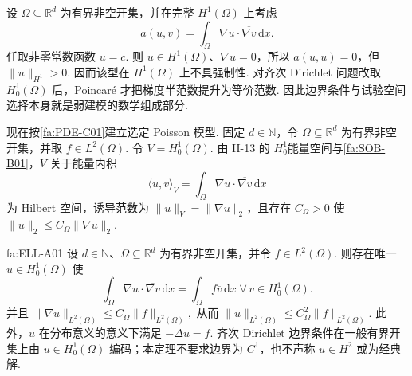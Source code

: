 \begin{FACounterexample}[试验空间选择会决定强制性]\label{ii15:h1-gradient-noncoercive}
设 \(\displaystyle\Omega\subseteq\mathbb R^d\) 为有界非空开集，并在完整 \(\displaystyle H^1(\Omega)\) 上考虑
\[
a(u,v)
=
\int_\Omega
\nabla u\mathbin{\cdot}\overline{\nabla v}
\,\mathrm{d}x.
\]
任取非零常数函数 \(\displaystyle u=c\). 则 \(\displaystyle u\in H^1(\Omega)\)、\(\displaystyle\nabla u=0\)，所以 \(\displaystyle a(u,u)=0\)，但 \(\displaystyle\|u\|_{H^1}>0\). 因而该型在 \(\displaystyle H^1(\Omega)\) 上不具强制性. 对齐次 Dirichlet 问题改取 \(\displaystyle H_0^1(\Omega)\) 后，Poincaré 才把梯度半范数提升为等价范数. 因此边界条件与试验空间选择本身就是弱建模的数学组成部分.
\end{FACounterexample}

现在按\autoref{fa:PDE-C01}建立选定 Poisson 模型. 固定 \(\displaystyle d\in\mathbb N\)，令 \(\displaystyle\Omega\subseteq\mathbb R^d\) 为有界非空开集，并取 \(\displaystyle f\in L^2(\Omega)\). 令 \(\displaystyle V=H_0^1(\Omega).\)
由 II-13 的 \(\displaystyle H_0^1\)能量空间与\autoref{fa:SOB-B01}，\(\displaystyle V\) 关于能量内积
\[
\langle u,v\rangle_V
=
\int_\Omega
\nabla u\mathbin{\cdot}\overline{\nabla v}
\,\mathrm{d}x
\]
为 Hilbert 空间，诱导范数为 \(\displaystyle\|u\|_V=\|\nabla u\|_2\)，且存在 \(\displaystyle C_\Omega>0\) 使 \(\displaystyle\|u\|_2\leqslant C_\Omega\|\nabla u\|_2\).

\begin{FATheorem}{fa:ELL-A01}
设 \(\displaystyle d\in\mathbb N\)、\(\displaystyle\Omega\subseteq\mathbb R^d\) 为有界非空开集，并令 \(\displaystyle f\in L^2(\Omega)\). 则存在唯一 \(\displaystyle u\in H_0^1(\Omega)\) 使
\[
\int_\Omega
\nabla u\mathbin{\cdot}\overline{\nabla v}
\,\mathrm{d}x
=
\int_\Omega
f\overline v
\,\mathrm{d}x
\;
\forall\,v\in H_0^1(\Omega).
\]
并且 \(\displaystyle \|\nabla u\|_{L^2(\Omega)} \leqslant C_\Omega\|f\|_{L^2(\Omega)},\)
从而 \(\displaystyle \|u\|_{L^2(\Omega)} \leqslant C_\Omega^2\|f\|_{L^2(\Omega)}.\)
此外，\(\displaystyle u\) 在分布意义的意义下满足 \(\displaystyle-\Delta u=f\). 齐次 Dirichlet 边界条件在一般有界开集上由 \(\displaystyle u\in H_0^1(\Omega)\) 编码；本定理不要求边界为 \(\displaystyle C^1\)，也不声称 \(\displaystyle u\in H^2\) 或为经典解.
\end{FATheorem}

